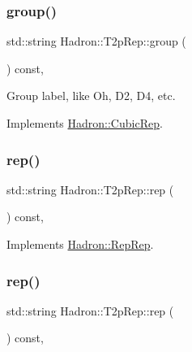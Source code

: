 \subsubsection{\texorpdfstring{group()}{group()}\hspace{0.1cm}{\footnotesize\ttfamily [3/3]}}
{\footnotesize\ttfamily std\+::string Hadron\+::\+T2p\+Rep\+::group (\begin{DoxyParamCaption}{ }\end{DoxyParamCaption}) const\hspace{0.3cm}{\ttfamily [inline]}, {\ttfamily [virtual]}}

Group label, like Oh, D2, D4, etc. 

Implements \mbox{\hyperlink{structHadron_1_1CubicRep_a0748f11ec87f387062c8e8981339a29c}{Hadron\+::\+Cubic\+Rep}}.

\mbox{\label{structHadron_1_1T2pRep_abf712164cb437c03107c2467574b32c1}} 
\subsubsection{\texorpdfstring{rep()}{rep()}\hspace{0.1cm}{\footnotesize\ttfamily [1/5]}}
{\footnotesize\ttfamily std\+::string Hadron\+::\+T2p\+Rep\+::rep (\begin{DoxyParamCaption}{ }\end{DoxyParamCaption}) const\hspace{0.3cm}{\ttfamily [inline]}, {\ttfamily [virtual]}}



Implements \mbox{\hyperlink{structHadron_1_1RepRep_ab3213025f6de249f7095892109575fde}{Hadron\+::\+Rep\+Rep}}.

\mbox{\label{structHadron_1_1T2pRep_abf712164cb437c03107c2467574b32c1}} 
\subsubsection{\texorpdfstring{rep()}{rep()}\hspace{0.1cm}{\footnotesize\ttfamily [2/5]}}
{\footnotesize\ttfamily std\+::string Hadron\+::\+T2p\+Rep\+::rep (\begin{DoxyParamCaption}{ }\end{DoxyParamCaption}) const\hspace{0.3cm}{\ttfamily [inline]}, {\ttfamily [virtual]}}



